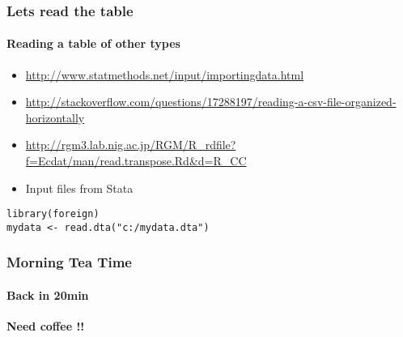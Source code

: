 \documentclass[12pt]{beamer}\usepackage[]{graphicx}\usepackage[]{color}
\begin{document}
\begin{frame}[fragile]
  \frametitle{Lets read the table}
  \framesubtitle{Reading a table of other types}
\begin{itemize}  
\item \url{http://www.statmethods.net/input/importingdata.html}
\item \url{http://stackoverflow.com/questions/17288197/reading-a-csv-file-organized-horizontally}
\item \url{http://rgm3.lab.nig.ac.jp/RGM/R_rdfile?f=Ecdat/man/read.transpose.Rd&d=R_CC}
\item Input files from Stata
\end{itemize}
\begin{lstlisting} 
library(foreign)
mydata <- read.dta("c:/mydata.dta")  
\end{lstlisting} 
\end{frame}

\begin{frame}
  \frametitle{Morning Tea Time}
  \framesubtitle{Back in 20min}
  {\bf Need coffee !!} 
\end{frame}
\end{document}
